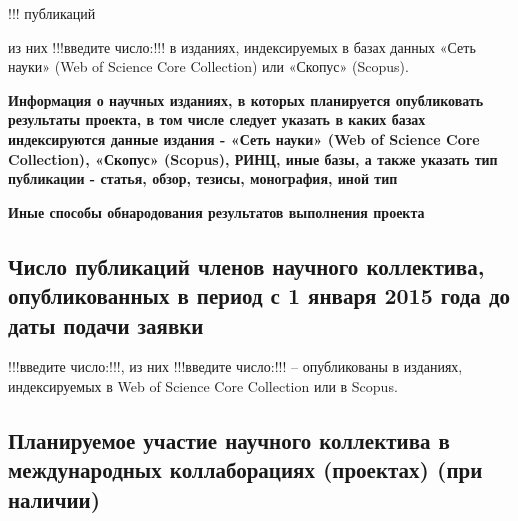 \documentclass[12pt]{article}  %
\theoremstyle{remark}
\begin{document}
!!! публикаций

из них !!!введите число:!!! в изданиях, индексируемых в базах данных «Сеть науки» (Web of Science Core Collection) или «Скопус» (Scopus).

\textbf{Информация о научных изданиях, в которых планируется опубликовать результаты проекта, в том числе следует указать в каких базах индексируются данные издания - «Сеть науки» (Web of Science Core Collection), «Скопус» (Scopus), РИНЦ, иные базы, а также указать тип публикации - статья, обзор, тезисы, монография, иной тип}


\textbf{Иные способы обнародования результатов выполнения проекта}

\subsection{Число публикаций членов научного коллектива, опубликованных в период с 1 января 2015 года до даты подачи заявки}

!!!введите число:!!!, из них !!!введите число:!!! – опубликованы в изданиях, индексируемых в Web of Science Core Collection или в Scopus.

\subsection{Планируемое участие научного коллектива в международных коллаборациях (проектах) (при наличии)}
\end{document}
